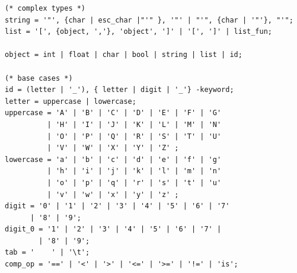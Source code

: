 \documentclass[a4paper,11pt]{article}
\begin{document}
\begin{verbatim}
(* complex types *)
string = '"', {char | esc_char |"'" }, '"' | "'", {char | '"'}, "'";
list = '[', {object, ','}, 'object', ']' | '[', ']' | list_fun;

object = int | float | char | bool | string | list | id;

(* base cases *)
id = (letter | '_'), { letter | digit | '_'} -keyword;
letter = uppercase | lowercase;
uppercase = 'A' | 'B' | 'C' | 'D' | 'E' | 'F' | 'G'
          | 'H' | 'I' | 'J' | 'K' | 'L' | 'M' | 'N'
          | 'O' | 'P' | 'Q' | 'R' | 'S' | 'T' | 'U'
          | 'V' | 'W' | 'X' | 'Y' | 'Z' ;
lowercase = 'a' | 'b' | 'c' | 'd' | 'e' | 'f' | 'g'
          | 'h' | 'i' | 'j' | 'k' | 'l' | 'm' | 'n'
          | 'o' | 'p' | 'q' | 'r' | 's' | 't' | 'u'
          | 'v' | 'w' | 'x' | 'y' | 'z' ;
digit = '0' | '1' | '2' | '3' | '4' | '5' | '6' | '7'
      | '8' | '9';
digit_0 = '1' | '2' | '3' | '4' | '5' | '6' | '7' | 
        | '8' | '9';
tab = '    ' | '\t';
comp_op = '==' | '<' | '>' | '<=' | '>=' | '!=' | 'is';

	\end{verbatim}
\end{document}
